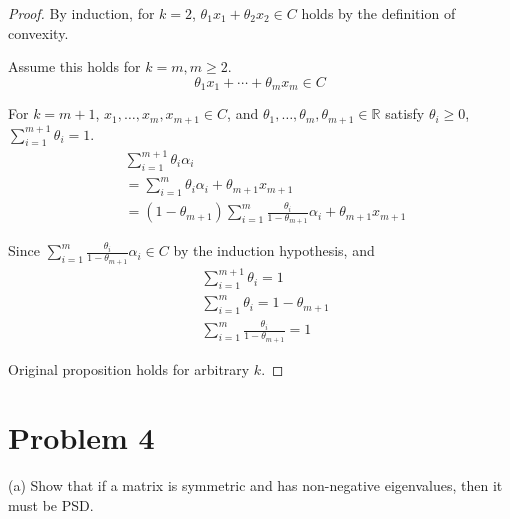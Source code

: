 \documentclass[11pt]{article}
\newcommand{\RR}{\mathbb{R}}
\begin{document}
\begin{proof}
    By induction, for $k=2$, $\theta_1 x_1 + \theta_2 x_2 \in C$ holds by the definition of convexity.
    
    Assume this holds for $k=m, m\geq 2$.
    $$\theta_1 x_1+\cdots+\theta_m x_m \in C$$

    For $k=m+1$, $x_1, \dots, x_m, x_{m+1} \in C$, and $\theta_1, \dots, \theta_m,  \theta_{m+1}\in \RR$ satisfy $\theta_i \geq 0$, $\sum_{i=1}^{m+1}\theta_i=1$.
    \begin{align*}
        &\sum_{i=1}^{m+1} \theta_i\alpha_i\\
        & = \sum_{i=1}^{m} \theta_i\alpha_i + \theta_{m+1}x_{m+1}\\
        &= (1-\theta_{m+1}) \sum_{i=1}^{m} \frac{\theta_i}{1-\theta_{m+1}}\alpha_i + \theta_{m+1}x_{m+1}
    \end{align*}

    Since $\sum_{i=1}^{m} \frac{\theta_i}{1-\theta_{m+1}}\alpha_i \in C$  by the induction hypothesis, and     
    \begin{align*}
        &\sum_{i=1}^{m+1}\theta_i=1\\
        &\sum_{i=1}^{m}\theta_i = 1 - \theta_{m+1}\\
        &\sum_{i=1}^{m} \frac{\theta_i}{1-\theta_{m+1}} = 1
    \end{align*}

    Original proposition holds for arbitrary $k$.
\end{proof}

\clearpage
\section*{Problem 4}
(a) Show that if a matrix is symmetric and has non-negative eigenvalues, then it must be PSD.
\end{document}
